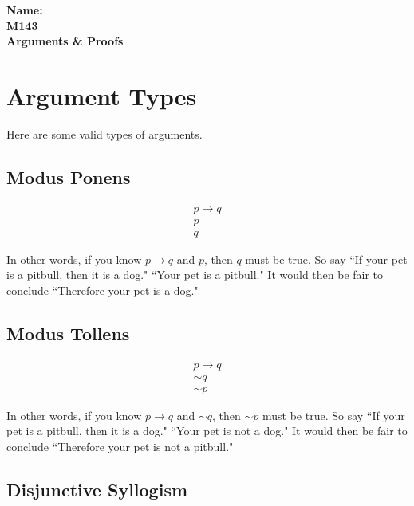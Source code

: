\documentclass[10pt]{article}
\theoremstyle{definition}
\begin{document}
%

{\bf Name:} \hrulefill\hrulefill\hrulefill\\
{\bf M143} \qquad \qquad \\
{\bf Arguments \& Proofs}\\ %



\section{Argument Types}

Here are some valid types of arguments.

\subsection{Modus Ponens}

$$\begin{array}{l}
p\to q \\
p\\
\hline
q
\end{array}$$

In other words, if you know $p\to q$ and $p$, then $q$ must be true.  So say ``If your pet is a pitbull, then it is a dog."  ``Your pet is a pitbull."  It would then be fair to conclude ``Therefore your pet is a dog."




\subsection{Modus Tollens}

$$\begin{array}{l}
p\to q \\
\sim q\\
\hline
\sim p
\end{array}$$

In other words, if you know $p\to q$ and $\sim q$, then $\sim p$ must be true.  So say ``If your pet is a pitbull, then it is a dog."  ``Your pet is not a dog."  It would then be fair to conclude ``Therefore your pet is not a pitbull."


\subsection{Disjunctive Syllogism}
\end{document}
